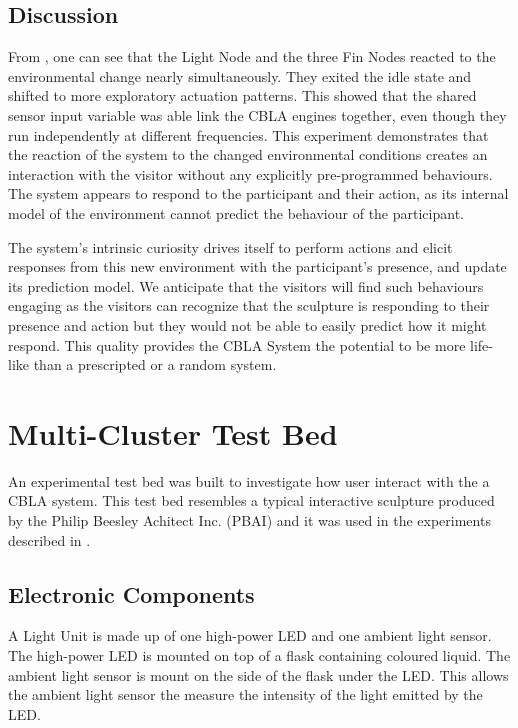 \subsection{Discussion}

From , one can see that the Light Node and the three Fin Nodes reacted to the environmental change nearly simultaneously. They exited the idle state and shifted to more exploratory actuation patterns. This showed that the shared sensor input variable was able link the CBLA engines together, even though they run independently at different frequencies. This experiment demonstrates that the reaction of the system to the changed environmental conditions creates an interaction with the visitor without any explicitly pre-programmed behaviours. The system appears to respond to the participant and their action, as its internal model of the environment cannot predict the behaviour of the participant. 

The system's intrinsic curiosity drives itself to perform actions and elicit responses from this new environment with the participant's presence, and update its prediction model. We anticipate that the visitors will find such behaviours engaging as the visitors can recognize that the sculpture is responding to their presence and action but they would not be able to easily predict how it might respond. This quality provides the CBLA System the potential to be more life-like than a prescripted or a random system. 


\section{Multi-Cluster Test Bed}\label{sec:multi-cluster-test-bed}

An experimental test bed was built to investigate how user interact with the a CBLA system. This test bed resembles a typical interactive sculpture produced by the Philip Beesley Achitect Inc. (PBAI) and it was used in the experiments described in .


\subsection{Electronic Components}

A Light Unit is made up of one high-power LED and one ambient light sensor. The high-power LED is mounted on top of a flask containing coloured liquid. The ambient light sensor is mount on the side of the flask under the LED. This allows the ambient light sensor the measure the intensity of the light emitted by the LED. 

